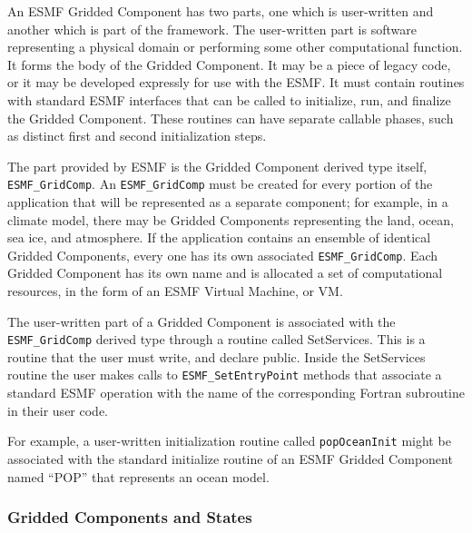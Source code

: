 An ESMF Gridded Component has two parts, one which is user-written
and another which is part of the framework.  The user-written
part is software representing a physical domain or performing some
other computational function.  It forms the body of the Gridded 
Component.  It may be a piece of legacy code, or it may be developed 
expressly for use with the ESMF.  It must contain routines with
standard ESMF interfaces that can be called to initialize, run, and
finalize the Gridded Component.  These routines can have separate 
callable phases, such as distinct first and second initialization steps.

The part provided by ESMF is the Gridded Component derived type 
itself, {\tt ESMF\_GridComp}.  An {\tt ESMF\_GridComp} must be created 
for every portion of the application that will be represented 
as a separate component; for example, in a climate model, there may 
be Gridded Components representing the land, ocean, sea ice, and 
atmosphere.  If the application contains an ensemble of identical 
Gridded Components, every one has its own associated {\tt ESMF\_GridComp}.
Each Gridded Component has its own name and is allocated
a set of computational resources, in the form of an ESMF Virtual
Machine, or VM.

The user-written part of a Gridded Component is associated with the
{\tt ESMF\_GridComp} derived type through a routine called SetServices.
This is a routine that the user must write, and declare public.
Inside the SetServices routine the user makes calls to 
{\tt ESMF\_SetEntryPoint} methods that associate a standard ESMF 
operation with the name of the corresponding Fortran subroutine in their user code.  

For example, a user-written initialization routine called {\tt popOceanInit} 
might be associated with the standard initialize routine of an ESMF 
Gridded Component named ``POP'' that represents an ocean model.

\subsubsection{Gridded Components and States}







